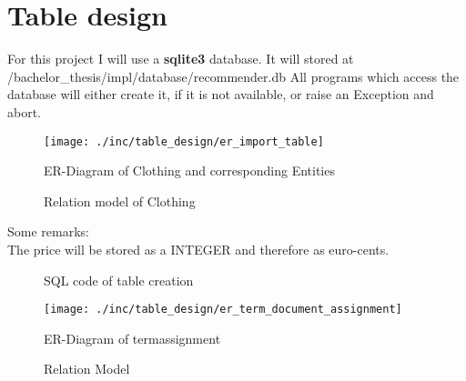

\section{Table design}
For this project I will use a \textbf{sqlite3} database.
It will stored at /bachelor\_thesis/impl/database/recommender.db
All programs which access the database will either create it, if it is not available, or raise an Exception and abort.\\

\begin{figure}[h]
    \texttt{[image: ./inc/table\_design/er\_import\_table]}
    \caption{ER-Diagram of Clothing and corresponding Entities}
\end{figure}

\begin{figure}[h]
    \caption{Relation model of Clothing}
\end{figure}

\bigskip
Some remarks:\\
The price will be stored as a INTEGER and therefore as euro-cents.\\

\begin{figure}[h]
    
    \caption{SQL code of table creation}
\end{figure}

\begin{figure}[h]
    \texttt{[image: ./inc/table\_design/er\_term\_document\_assignment]}
    \caption{ER-Diagram of termassignment}
\end{figure}

\begin{figure}[h]
    \caption{Relation Model}
\end{figure}

